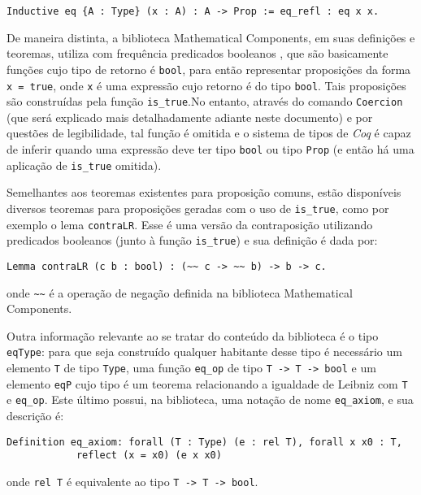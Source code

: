 \begin{lstlisting}[language = coq]
    Inductive eq {A : Type} (x : A) : A -> Prop := eq_refl : eq x x.
\end{lstlisting}

De maneira distinta, a biblioteca Mathematical Components, em suas definições e teoremas, utiliza com frequência predicados booleanos \cite{assia_mahboubi_2022_7118596}, que são basicamente funções cujo tipo de retorno é \lstinline[language = coq]!bool!, para então representar proposições da forma \lstinline[language = coq]$x = true$, onde \lstinline[language = coq]$x$ é uma expressão cujo retorno é do tipo \lstinline[language = coq]!bool!. Tais proposições são construídas pela função \lstinline[language = coq]$is_true$.No entanto, através do comando \lstinline[language = coq]$Coercion$ (que será explicado mais detalhadamente adiante neste documento) e por questões de legibilidade, tal função é omitida e o sistema de tipos de \textit{Coq} é capaz de inferir quando uma expressão deve ter tipo \lstinline[language = coq]$bool$ ou tipo \lstinline[language = coq]$Prop$ (e então há uma aplicação de \lstinline[language = coq]$is_true$ omitida). 

Semelhantes aos teoremas existentes para proposição comuns, estão disponíveis diversos teoremas para proposições geradas com o uso de \lstinline[language = coq]$is_true$, como por exemplo o lema \lstinline[language = coq]$contraLR$. Esse é uma versão da contraposição utilizando predicados booleanos (junto à função \lstinline[language = coq]$is_true$) e sua definição é dada por:
\begin{lstlisting}[language = coq]
        Lemma contraLR (c b : bool) : (~~ c -> ~~ b) -> b -> c.
\end{lstlisting}
onde \lstinline[language = coq]$~~$ é a operação de negação definida na biblioteca Mathematical Components.

Outra informação relevante ao se tratar do conteúdo da biblioteca é o tipo \lstinline[language = coq]$eqType$: para que seja construído qualquer habitante desse tipo é necessário um elemento \lstinline[language = coq]$T$ de tipo 
\lstinline[language = coq]$Type$, uma função \lstinline[language = coq]$eq_op$ de tipo \lstinline[language = coq]$T -> T -> bool$
e um elemento \lstinline[language = coq]$eqP$ cujo tipo é um teorema relacionando a igualdade de Leibniz com \lstinline[language = coq]$T$ e \lstinline[language = coq]$eq_op$. Este último possui, na biblioteca, uma notação de nome \lstinline[language = coq]$eq_axiom$, e sua descrição é:
\begin{lstlisting}[language = coq]
    Definition eq_axiom: forall (T : Type) (e : rel T), forall x x0 : T, 
            reflect (x = x0) (e x x0)
\end{lstlisting}
onde \lstinline[language = coq]$rel T$ é equivalente ao tipo \lstinline[language = coq]$T -> T -> bool$.

